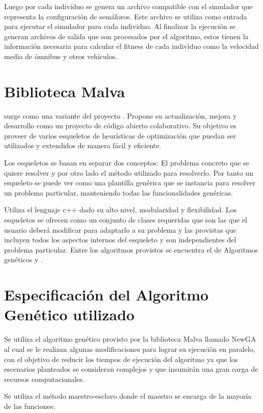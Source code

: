 Luego por cada individuo se genera un archivo compatible con el simulador que representa la configuración de semáforos. Este archivo se utiliza como entrada para ejecutar el simulador para cada individuo. Al finalizar la ejecución se generan archivos de salida que son procesados por el algoritmo, estos tienen la información necesaria para calcular el fitness de cada individuo como la velocidad media de ómnibus y otros vehículos.


\section{Biblioteca Malva}

\citet{Malva} surge como una variante del proyecto \citet{Mallba}. Propone su actualización, mejora y desarrollo como un proyecto de código abierto colaborativo.  Su objetivo es proveer de varios esqueletos de  heurísticas de optimización que puedan ser utilizados y extendidos de manera fácil y eficiente.

Los esqueletos se basan en separar dos conceptos: El problema concreto que se quiere resolver y por otro lado el método utilizado para resolverlo. Por tanto un esqueleto se puede ver como una plantilla genérica que se instancia para resolver un problema particular, manteniendo todas las funcionalidades genéricas.

Utiliza el lenguaje c++ dado su alto nivel, modularidad y flexibilidad. Los esqueletos se ofrecen como un conjunto de clases requeridas que son las que el usuario deberá modificar para adaptarlo a su problema y las provistas que incluyen todos los aspectos internos del esqueleto y son independientes del problema particular. Entre los algoritmos provistos se encuentra el de Algoritmos genéticos y \citet{CHC}.



\newpage

\section{Especificación del Algoritmo Genético utilizado}
Se utiliza el algoritmo genético provisto por la biblioteca  Malva  llamado NewGA al cual se le realizan algunas modificaciones para lograr su ejecución en paralelo, con el objetivo de reducir los tiempos de ejecución del algoritmo ya que los escenarios planteados se consideran complejos y que insumirán una gran carga de recursos computacionales.

Se utiliza el método maestro-esclavo donde el maestro se encarga de la mayoría de las funciones:

